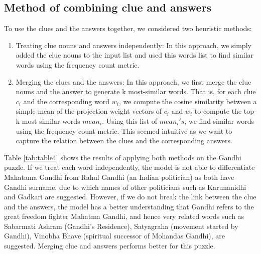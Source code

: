 \documentclass[twoside]{article}
\begin{document}
\subsection{Method of combining clue and answers}
\label{sec:sec3.4}
To use the clues and the answers together, we considered two heuristic methods:
\begin{enumerate}
\item Treating clue nouns and answers independently: In this approach, we simply added the clue nouns to the input list and used this words list to find similar words using the frequency count metric.
\item Merging the clues and the answers: In this approach, we first merge the clue nouns and the answer to generate k most-similar words. That is, for each clue $c_i$ and the corresponding word $w_i$, we compute the cosine similarity between a simple mean of the projection weight vectors of $c_i$  and $w_i$ to compute the top-k most similar words $mean_i$. Using this list of $mean_i's$, we find similar words using the frequency count metric. This seemed intuitive as we want to capture the relation between the clues and the corresponding answers.

\end{enumerate}
Table \ref{tab:table4} shows the results of applying both methods on the Gandhi puzzle. If we treat each word independently, the model is not able to differentiate Mahatama Gandhi from Rahul Gandhi (an Indian politician) as both have Gandhi surname, due to which names of other politicians such as Karunanidhi and Gadkari are suggested. However, if we do not break the link between the clue and the answers, the model has a better understanding that Gandhi refers to the great freedom fighter Mahatma Gandhi, and hence very related words such as Sabarmati Ashram (Gandhi's Residence), Satyagraha (movement started by Gandhi), Vinobha Bhave (spiritual successor of Mohandas Gandhi), are suggested. Merging clue and answers performs better for this puzzle.
\end{document}
